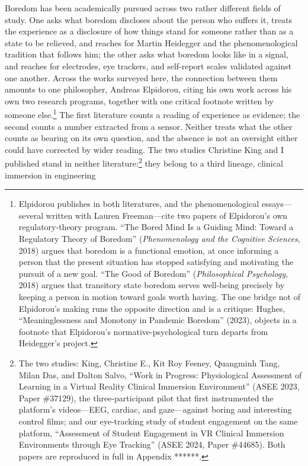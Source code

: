 Boredom has been academically pursued across two rather different fields of study. One asks
what boredom discloses about the person who suffers it, treats the experience as a disclosure
of how things stand for someone rather than as a state to be relieved, and reaches for Martin
Heidegger and the phenomenological tradition that follows him; the other asks what boredom
looks like in a signal, and reaches for electrodes, eye trackers, and self-report scales
validated against one another. Across the works surveyed here, the connection between them
amounts to one philosopher, Andreas Elpidorou, citing his own work across his own two research
programs, together with one critical footnote written by someone else.\footnote{Elpidorou
publishes in both literatures, and the phenomenological essays---several written with Lauren
Freeman---cite two papers of Elpidorou's own regulatory-theory program. ``The Bored Mind Is a
Guiding Mind: Toward a Regulatory Theory of Boredom'' (\textit{Phenomenology and the Cognitive
Sciences}, 2018) argues that boredom is a functional emotion, at once informing a person that
the present situation has stopped satisfying and motivating the pursuit of a new goal. ``The
Good of Boredom'' (\textit{Philosophical Psychology}, 2018) argues that transitory state
boredom serves well-being precisely by keeping a person in motion toward goals worth having.
The one bridge not of Elpidorou's making runs the opposite direction and is a critique:
Hughes, ``Meaninglessness and Monotony in Pandemic Boredom'' (2023), objects in a footnote
that Elpidorou's normative-psychological turn departs from Heidegger's project.} The first
literature counts a reading of experience
as evidence; the second counts a number extracted from a sensor. Neither treats what the
other counts as bearing on its own question, and the absence is not an oversight either could
have corrected by wider reading. The two studies Christine King and I published stand in
neither literature:\footnote{The two studies: King, Christine E., Kit Roy Feeney, Quangminh
Tang, Milan Das, and Dalton Salvo, ``Work in Progress: Physiological Assessment of Learning
in a Virtual Reality Clinical Immersion Environment'' (ASEE 2023, Paper \#37129), the
three-participant pilot that first instrumented the platform's videos---EEG, cardiac, and
gaze---against boring and interesting control films; and our eye-tracking study of student
engagement on the same platform, ``Assessment of Student Engagement in VR Clinical Immersion
Environments through Eye Tracking'' (ASEE 2024, Paper \#44685). Both papers are reproduced in
full in Appendix ******.} they belong to a third lineage, clinical immersion in engineering
